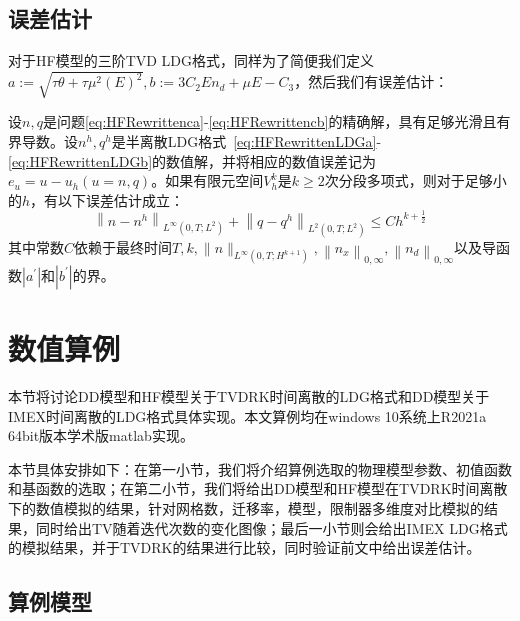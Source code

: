 \subsection{误差估计}
对于HF模型的三阶TVD LDG格式，同样为了简便我们定义$a:=\sqrt{\tau \theta+\tau \mu^{2}\left(E\right)^{2}}, b:=3 C_{2} E n_{d}+\mu E-C_{3}$，然后我们有误差估计\cite{liu2010error}：
\begin{theorem}
    设$n, q$是问题\eqref{eq:HFRewrittenca}-\eqref{eq:HFRewrittencb}的精确解，具有足够光滑且有界导数。设$n^{h}, q^{h}$是半离散LDG格式~\eqref{eq:HFRewrittenLDGa}-\eqref{eq:HFRewrittenLDGb}的数值解，并将相应的数值误差记为$e_{u}=u-u_{h}(u=n, q)$。如果有限元空间$V_{h}^{k}$是$k \geq 2$次分段多项式，则对于足够小的$h$，有以下误差估计成立：
    $$
        \left\|n-n^{h}\right\|_{L^{\infty}\left(0, T ; L^{2}\right)}+\left\|q-q^{h}\right\|_{L^{2}\left(0, T ; L^{2}\right)} \leq C h^{k+\frac{1}{2}}
    $$
    其中常数$C$依赖于最终时间$T, k, \|n\|_{L^{\infty}\left(0, T ; H^{k+1}\right)}, \left\|n_{x}\right\|_{0, \infty}, \left\|n_{d}\right\|_{0, \infty}$以及导函数$\left|a^{\prime}\right|$和$\left|b^{\prime}\right|$的界。
\end{theorem}
\section{数值算例}
本节将讨论DD模型和HF模型关于TVDRK时间离散的LDG格式和DD模型关于IMEX时间离散的LDG格式具体实现。本文算例均在windows 10系统上R2021a 64bit版本学术版matlab实现。

本节具体安排如下：在第一小节，我们将介绍算例选取的物理模型参数、初值函数和基函数的选取；在第二小节，我们将给出DD模型和HF模型在TVDRK时间离散下的数值模拟的结果，针对网格数，迁移率，模型，限制器多维度对比模拟的结果，同时给出TV随着迭代次数的变化图像；最后一小节则会给出IMEX LDG格式的模拟结果，并于TVDRK的结果进行比较，同时验证前文中给出误差估计。
\subsection{算例模型}
